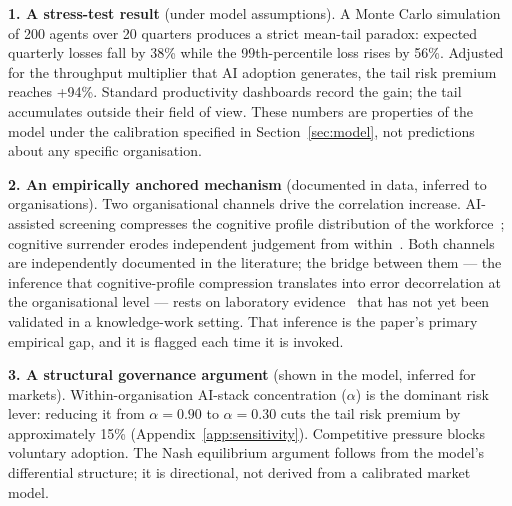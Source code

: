 \documentclass[11pt,a4paper]{article}
\begin{document}
\begin{mdframed}[linewidth=0.8pt,frametitle={Three contributions}]

\textbf{1. A stress-test result} (under model assumptions). A Monte Carlo
simulation of 200 agents over 20 quarters produces a strict mean-tail paradox:
expected quarterly losses fall by 38\% while the 99th-percentile loss rises by
56\%. Adjusted for the throughput multiplier that AI adoption generates, the tail
risk premium reaches +94\%. Standard productivity dashboards record the gain; the
tail accumulates outside their field of view. These numbers are properties of the
model under the calibration specified in Section~\ref{sec:model}, not
predictions about any specific organisation.

\textbf{2. An empirically anchored mechanism} (documented in data, inferred to
organisations). Two organisational channels drive the correlation increase.
AI-assisted screening compresses the cognitive profile distribution of the
workforce~\cite{fuller_hbs_2021,an_pnasnexus_2025,wilson_aies_2024};
cognitive surrender erodes independent judgement from
within~\cite{shaw_psyarxiv_2026,dellacqua_orgscience_2026}. Both channels are
independently documented in the literature; the bridge between them --- the inference that
cognitive-profile compression translates into error decorrelation at the
organisational level --- rests on laboratory
evidence~\cite{keck_psychsci_2020} that has not yet been validated in a
knowledge-work setting. That inference is the paper's primary empirical gap, and
it is flagged each time it is invoked.

\textbf{3. A structural governance argument} (shown in the model, inferred for
markets). Within-organisation AI-stack concentration ($\alpha$) is the dominant
risk lever: reducing it from $\alpha = 0.90$ to $\alpha = 0.30$ cuts the tail
risk premium by approximately 15\%
(Appendix~\ref{app:sensitivity}). Competitive pressure blocks voluntary
adoption. The Nash equilibrium argument follows from the model's differential
structure; it is directional, not derived from a calibrated market model.
\end{mdframed}
\end{document}
